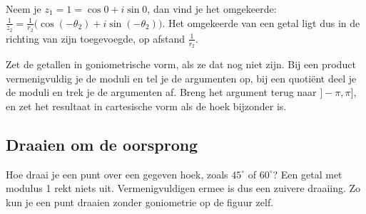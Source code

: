 Neem je $z_1 = 1 = \cos 0 + i\sin 0$, dan vind je het omgekeerde: $\frac{1}{z_2} = \frac{1}{r_2}\bigl(\cos(-\theta_2) + i\sin(-\theta_2)\bigr)$. Het omgekeerde van een getal ligt dus in de richting van zijn toegevoegde, op afstand $\frac{1}{r_2}$.


\begin{werkwijze}
Zet de getallen in goniometrische vorm, als ze dat nog niet zijn. Bij een product vermenigvuldig je de moduli en tel je de argumenten op, bij een quotiënt deel je de moduli en trek je de argumenten af. Breng het argument terug naar $]-\pi, \pi]$, en zet het resultaat in cartesische vorm als de hoek bijzonder is.
\end{werkwijze}


\begin{oefeningen}

\end{oefeningen}

\subsection{Draaien om de oorsprong}

Hoe draai je een punt over een gegeven hoek, zoals $45^\circ$ of $60^\circ$? Een getal met modulus 1 rekt niets uit. Vermenigvuldigen ermee is dus een zuivere draaiing. Zo kun je een punt draaien zonder goniometrie op de figuur zelf.


